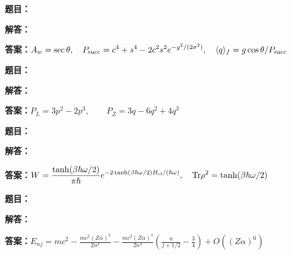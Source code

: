 \documentclass[lang=cn,color=blue,11pt]{elegantbook}
\begin{document}
\par\smallskip\noindent\hrulefill\par\medskip
{}\par
\noindent\textbf{题目：}
\par\noindent\textbf{解答：}
\par\noindent\textbf{答案：}\(\displaystyle A_w=\sec\theta,\quad P_{\rm succ}=c^4+s^4-2c^2s^2e^{-g^2/(2\sigma^2)},\quad\langle q\rangle_f=g\cos\theta/P_{\rm succ}\)\par
\par\smallskip\noindent\hrulefill\par\medskip
{}\par
\noindent\textbf{题目：}
\par\noindent\textbf{解答：}
\par\noindent\textbf{答案：}\(\displaystyle P_L=3p^2-2p^3,\qquad P_Z=3q-6q^2+4q^3\)\par
\par\smallskip\noindent\hrulefill\par\medskip
{}\par
\noindent\textbf{题目：}
\par\noindent\textbf{解答：}
\par\noindent\textbf{答案：}\(\displaystyle W=\frac{\tanh(\beta\hbar\omega/2)}{\pi\hbar}e^{-2\tanh(\beta\hbar\omega/2)H_{\rm cl}/(\hbar\omega)},\quad \mathrm{Tr}\rho^2=\tanh(\beta\hbar\omega/2)\)\par
\par\smallskip\noindent\hrulefill\par\medskip
{}\par
\noindent\textbf{题目：}
\par\noindent\textbf{解答：}
\par\noindent\textbf{答案：}\(\displaystyle E_{nj}=mc^2-\frac{mc^2(Z\alpha)^2}{2n^2}-\frac{mc^2(Z\alpha)^4}{2n^4}\left(\frac{n}{j+1/2}-\frac34\right)+O((Z\alpha)^6)\)\par
\end{document}
